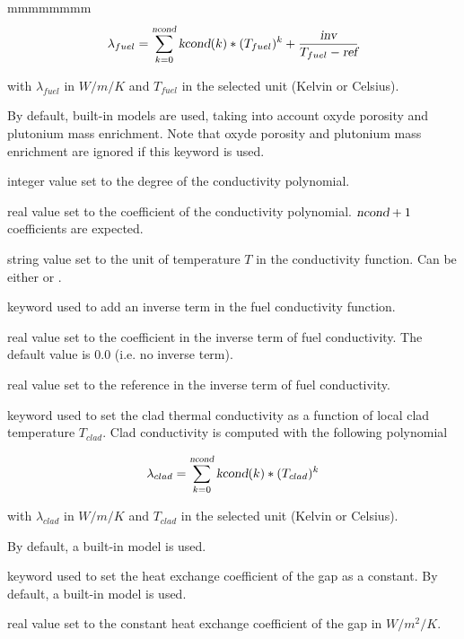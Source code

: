 \begin{ListeDeDescription}{mmmmmmmm}
$$\lambda_{fuel} = \sum_{k=0}^{\dusa{ncond}} {\dusa{kcond}(k)*(T_{fuel})^k + \frac{\dusa{inv}}{T_{fuel}-\dusa{ref}}}$$

with $\lambda_{fuel}$ in $W/m/K$ and $T_{fuel}$ in the selected unit (Kelvin or Celsius).

By default, built-in models are used, taking into account oxyde porosity and plutonium mass enrichment.
Note that oxyde porosity and plutonium mass enrichment are ignored if this keyword is used.

\item[\dusa{ncond}] integer value set to the degree of the conductivity polynomial.

\item[\dusa{kcond}] real value set to the coefficient of the conductivity polynomial. $\dusa{ncond}+1$ coefficients are expected.

\item[\dusa{unit}] string value set to the unit of temperature $T$ in the conductivity function. Can be either  or .

\item[\moc{INV}] keyword used to add an inverse term in the fuel conductivity function.

\item[\dusa{inv}] real value set to the coefficient in the inverse term of fuel conductivity.
The default value is 0.0 (i.e. no inverse term).

\item[\dusa{ref}] real value set to the reference in the inverse term of fuel conductivity.

\item[\moc{CONDC}] keyword used to set the clad thermal conductivity as a function of local clad temperature $T_{clad}$.
Clad conductivity is computed with the following polynomial

$$\lambda_{clad} = \sum_{k=0}^{\dusa{ncond}} {\dusa{kcond}(k)*(T_{clad})^k}$$

with $\lambda_{clad}$ in $W/m/K$ and $T_{clad}$ in the selected unit (Kelvin or Celsius).

By default, a built-in model is used.

\item[\moc{HGAP}] keyword used to set the heat exchange coefficient of the gap as a constant.
By default, a built-in model is used.

\item[\dusa{hgap}] real value set to the constant heat exchange coefficient of the gap in $W/m^2/K$.


\end{ListeDeDescription}
